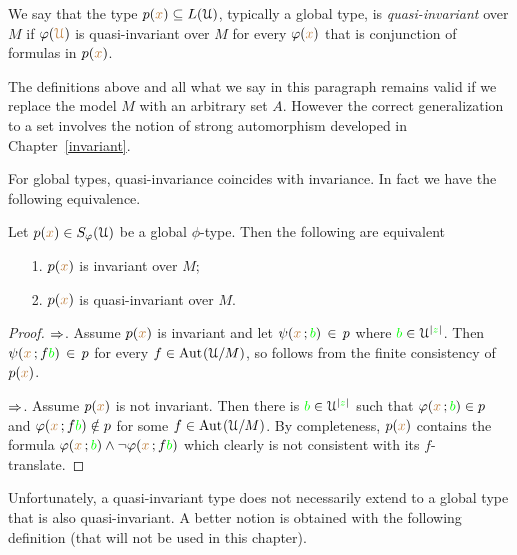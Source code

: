 \documentclass[creche.tex]{subfiles}
\begin{document}
We say that the type $p({\color{brown} x})\subseteq L(\EuScript U)$, typically a global type, is \emph{quasi-invariant\/} over $M$ if $\varphi({\color{brown}\EuScript U})$ is quasi-invariant over $M$  for every $\varphi({\color{brown} x})$ that is conjunction of formulas in $p({\color{brown} x})$.

The definitions above and all what we say in this paragraph remains valid if we replace the model $M$ with an arbitrary set $A$.
However the correct generalization to a set involves the notion of strong automorphism developed in Chapter~\ref{invariant}.

For global types, quasi-invariance coincides with invariance. In fact we have the following equivalence.


\begin{proposition}\label{prop_invariance-quasi-invariance}
Let $p({\color{brown} x})\in S_{\varphi}(\EuScript U)$ be a global $\phi$-type. Then the following are equivalent
\begin{itemize}
\item[1.] $p({\color{brown} x})$ is invariant over $M$;
\item[2.] $p({\color{brown} x})$ is quasi-invariant over $M$.
\end{itemize}
\end{proposition}
\begin{proof}
$\Rightarrow$.
Assume $p({\color{brown} x})$ is invariant and let $\psi({\color{brown} x}\,;{\color{green} b})\,\in\, p$ where ${\color{green} b}\in\EuScript U^{|{\color{green} z}|}$.
Then $\psi({\color{brown} x}\,;f{\color{green} b})\,\in\, p$ for every $f\in{\rm Aut\kern.15ex}(\EuScript U/M)$, so  follows from the finite consistency of $p({\color{brown} x})$.

$\Rightarrow$.
Assume $p({\color{brown} x})$ is not invariant.
Then there is ${\color{green} b}\in\EuScript U^{|{\color{green} z}|}$ such that $\varphi({\color{brown} x}\,;{\color{green} b})\in p$ and $\varphi({\color{brown} x}\,;f{\color{green} b})\notin p$ for some  $f\in{\rm Aut\kern.15ex}(\EuScript U/M)$.
By completeness, $p({\color{brown} x})$ contains the formula $\varphi({\color{brown} x}\,;{\color{green} b})\wedge\neg\varphi({\color{brown} x}\,;f{\color{green} b})$ which clearly is not consistent with its $f$-translate.
\end{proof}

Unfortunately, a quasi-invariant type does not necessarily extend to a global type that is also quasi-invariant.
A better notion is obtained with the following definition (that will not be used in this chapter).
\end{document}
